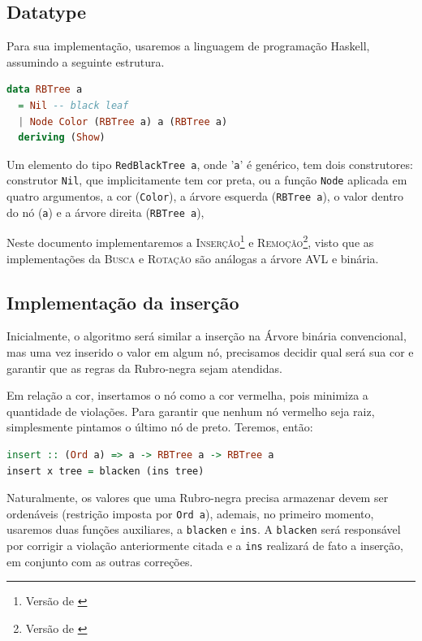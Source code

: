\subsection{Datatype}

Para sua implementação, usaremos a linguagem de programação Haskell, assumindo a seguinte estrutura.

\begin{lstlisting}[language=haskell, caption={Árvore Rubro-Negra}]
data RBTree a
  = Nil -- black leaf
  | Node Color (RBTree a) a (RBTree a)
  deriving (Show)
\end{lstlisting}

Um elemento do tipo \texttt{RedBlackTree a}, onde '\texttt{a}' é genérico, tem dois construtores: construtor \texttt{Nil}, que implicitamente tem cor preta, ou a função \texttt{Node} aplicada em quatro argumentos, a cor (\texttt{Color}), a árvore esquerda (\texttt{RBTree a}), o valor dentro do nó (\texttt{a}) e a árvore direita (\texttt{RBTree a}),

Neste documento implementaremos a \textrm{I\textsc{nserção}}\footnote{Versão de \cite{okasaki1999functional}} e \textrm{R\textsc{emoção}}\footnote{Versão de \cite{germane2014deletion}}, visto que as implementações da \textrm{B\textsc{usca}} e \textrm{R\textsc{otação}} são análogas a árvore AVL e binária.

\subsection{Implementação da inserção}


Inicialmente, o algoritmo será similar a inserção na Árvore binária convencional, mas uma vez inserido o valor em algum nó, precisamos decidir qual será sua cor e garantir que as regras da Rubro-negra sejam atendidas.

Em relação a cor, insertamos o nó como a cor vermelha, pois minimiza a quantidade de violações. Para garantir que nenhum nó vermelho seja raiz, simplesmente pintamos o último nó de preto. Teremos, então:

\begin{lstlisting}[language=haskell, caption={Função principal}]
insert :: (Ord a) => a -> RBTree a -> RBTree a
insert x tree = blacken (ins tree)
\end{lstlisting}
\FloatBarrier

Naturalmente, os valores que uma Rubro-negra precisa armazenar devem ser ordenáveis (restrição imposta por \texttt{Ord a}), ademais, no primeiro momento, usaremos duas funções auxiliares, a \texttt{blacken} e \texttt{ins}. A \texttt{blacken} será responsável por corrigir a violação anteriormente citada e a \texttt{ins} realizará de fato a inserção, em conjunto com as outras correções.

